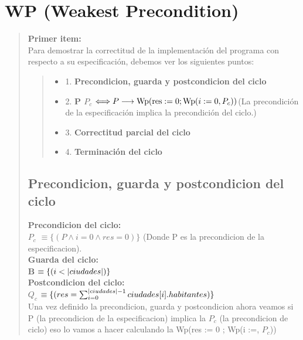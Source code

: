 \documentclass[10pt,a4paper]{article}
\begin{document}
\section{WP (Weakest Precondition)}
\begin{quote}
 \textbf{Primer item:} 
 \\
 Para demostrar la correctitud de la implementación del programa con respecto a su especificación, debemos ver los siguientes puntos:
 \begin{quote}
 \begin{itemize}
 	\item 1. \textbf{Precondicion, guarda y postcondicion del ciclo}
 	\item 2. \textbf{P \implica $P_c$} $\Longleftrightarrow P \longrightarrow \text{Wp}(\text{res} := 0; \text{Wp}(i := 0, P_c))$(La precondición de la especificación implica la precondición del ciclo.)
 	\item 3. \textbf{Correctitud parcial del ciclo} 
 	\item 4. \textbf{Terminación del ciclo} 
 \end{itemize}
 \end{quote}
 \subsection{Precondicion, guarda y postcondicion del ciclo}
 \textbf{Precondicion del ciclo:} \\ 
 \vspace{0.2cm}
 \textbf{$P_c$} $\equiv \{(P \land i = 0 \land res = 0)\}$ (Donde P es la precondicion de la especificacion).\\
 \vspace{0.2cm}
 \textbf{Guarda del ciclo:}\\ 
 \vspace{0.2cm}
 \textbf{B} $\equiv \{(i < |ciudades|)\}$ \\
 \vspace*{0.2cm}
 \textbf{Postcondicion del ciclo:} \\
 \vspace{0.2cm}
 \textbf{$Q_c$} $\equiv \{(res = \sum_{i=0}^{|ciudades|-1}ciudades[i].habitantes)\} $ \\ 
 \vspace{0.2cm}
 Una vez definido la precondicion, guarda y postcondicion ahora veamos si P (la precondicion de la especificacion) implica la $P_c$ (la precondicion de ciclo) eso lo vamos a hacer calculando la Wp(res := 0 ; Wp(i :=, $P_c$))

\end{quote}
\end{document}

